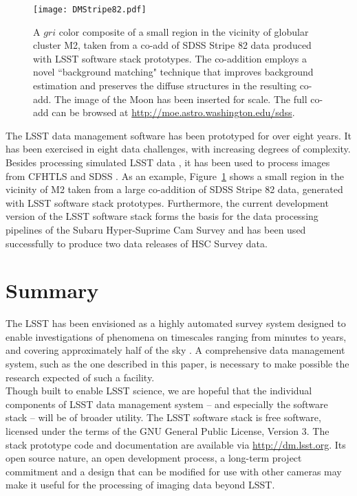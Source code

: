 \documentclass[11pt,twoside]{article}
\begin{document}
\begin{figure}[!t]
%
%
\texttt{[image: DMStripe82.pdf]}
\caption{
A $gri$ color composite of a small region in the vicinity of globular cluster M2, taken from a co-add of
SDSS Stripe 82 data produced with LSST software stack prototypes.  The
co-addition employs a novel ``background matching" technique
\citep{2014MNRAS.440.1296H} that improves
background estimation and preserves the diffuse structures in the resulting
co-add. The image of the Moon has been inserted for scale. The full
co-add can be browsed at \url{http://moe.astro.washington.edu/sdss}.}
\label{Fig:DMStripe82}
\end{figure}


The LSST data management software has been prototyped for over eight
years. It has been exercised in eight data challenges, with increasing
degrees of complexity. Besides processing simulated LSST data
\citep{2014SPIE.9150E..14C, 0067-0049-218-1-14}, it
has been used to process images from CFHTLS
and SDSS \citep{2009ApJS..182..543A}. As an example,
Figure~\ref{Fig:DMStripe82} shows a small region in the vicinity of M2
taken from a large co-addition of SDSS Stripe 82 data, generated with LSST
software stack prototypes. Furthermore, the current development version
of the LSST software stack forms the basis for the data processing pipelines
of the Subaru Hyper-Suprime Cam Survey \citep{2012SPIE.8446E..0ZM} and
has been used successfully to produce two data releases of HSC Survey data.
\\

\section{               Summary              }
\label{sec:summary}

The LSST has been envisioned as a highly automated survey system
designed to enable investigations of phenomena on timescales ranging
from minutes to years, and covering approximately half of the sky
\citep{2009arXiv0912.0201L}. A comprehensive data management system,
such as the one described in this paper, is necessary to make possible
the research expected of such a facility.
\\

Though built to enable LSST science, we are hopeful that the individual
components of LSST data management system -- and especially the software
stack -- will be of broader utility.  The LSST software stack is free
software, licensed under the terms of the GNU General Public License,
Version 3.  The stack prototype code and documentation are available via
\url{http://dm.lsst.org}. Its open source nature, an open development process,
a long-term project commitment and a design that can be modified for use
with other cameras may make it useful for the processing of imaging data
beyond LSST.
\\
\end{document}
